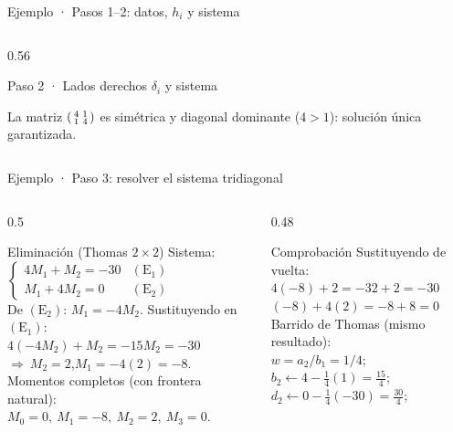 \documentclass[aspectratio=169,10pt]{beamer}
\begin{document}
\begin{frame}{Ejemplo · Pasos 1--2: datos, $h_i$ y sistema}
\begin{columns}[T]
\begin{column}{0.56\textwidth}
\begin{cardgear}{Paso 2 · Lados derechos $\delta_i$ y sistema}{\faCalculator}
\end{cardgear}
\vspace{1mm}
\begin{cardnota}[\faInfoCircle]
{\footnotesize La matriz $\begin{psmallmatrix}4&1\\ 1&4\end{psmallmatrix}$ es simétrica y diagonal dominante ($4>1$): solución única garantizada.}
\end{cardnota}
\end{column}
\end{columns}
\end{frame}

\begin{frame}{Ejemplo · Paso 3: resolver el sistema tridiagonal}
\begin{columns}[T]
\begin{column}{0.5\textwidth}
\begin{cardidea}{Eliminación (Thomas $2\times2$)}{\faCalculator}
{\footnotesize Sistema:\\[0.4mm]
$\begin{cases}4M_1+M_2=-30 & (\text{E}_1)\\ M_1+4M_2=0 & (\text{E}_2)\end{cases}$\\[1.0mm]
De $(\text{E}_2)$: $M_1=-4M_2$. Sustituyendo en $(\text{E}_1)$:\\[0.4mm]
$4(-4M_2)+M_2=-15M_2=-30$\\[0.4mm]
$\Rightarrow\ M_2=2$,\quad $M_1=-4(2)=-8$.\\[1.2mm]
Momentos completos (con frontera natural):\\[0.4mm]
$\boxed{M_0=0,\ M_1=-8,\ M_2=2,\ M_3=0.}$}
\end{cardidea}
\end{column}
\begin{column}{0.48\textwidth}
\begin{cardgear}{Comprobación}{\faCogs}
{\footnotesize Sustituyendo de vuelta:\\[0.4mm]
$4(-8)+2=-32+2=-30$ \checkmark\\[0.3mm]
$(-8)+4(2)=-8+8=0$ \checkmark\\[1.2mm]
Barrido de Thomas (mismo resultado):\\[0.2mm]
$w=a_2/b_1=1/4$;\ $b_2\leftarrow4-\tfrac14(1)=\tfrac{15}{4}$;\\[0.2mm]
$d_2\leftarrow0-\tfrac14(-30)=\tfrac{30}{4}$;\\[0.2mm]
}
\end{cardgear}
\end{column}
\end{columns}
\end{frame}
\end{document}
